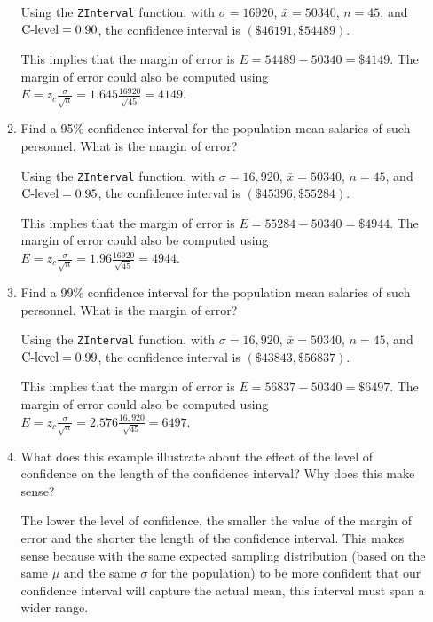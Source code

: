 \documentclass{article}
\newcommand{\answer}[1]{\color{red}#1}
\begin{document}
\begin{enumerate}
\begin{enumerate}
	{\answer Using the \texttt{ZInterval} function, with $\sigma = 16920$, $\bar{x} = 50340$, $n=45$, and $\textnormal{C-level} = 0.90$, the confidence interval is $(\$46191, \$54489)$. 
	
	This implies that the margin of error is $E = 54489 - 50340 = \$4149$. 
	The margin of error could also be computed using $\displaystyle E = z_c\frac{\sigma}{\sqrt{n}} = 1.645\frac{16920}{\sqrt{45}} = 4149$.
	} 

	\item Find a 95\% confidence interval for the population mean salaries of such personnel. What is the margin of error? 
	
	{\answer Using the \texttt{ZInterval} function, with $\sigma = 16,920$, $\bar{x} = 50340$, $n=45$, and $\textnormal{C-level} = 0.95$, the confidence interval is $(\$45396, \$55284)$. 
	
	This implies that the margin of error is $E = 55284 - 50340 = \$4944$. 
	The margin of error could also be computed using $\displaystyle E = z_c\frac{\sigma}{\sqrt{n}} = 1.96\frac{16920}{\sqrt{45}} =4944$.
	} 

	\item Find a 99\% confidence interval for the population mean salaries of such personnel. What is the margin of error? 
	
	{\answer Using the \texttt{ZInterval} function, with $\sigma = 16,920$, $\bar{x} = 50340$, $n=45$, and $\textnormal{C-level} = 0.99$, the confidence interval is $(\$43843, \$56837)$. 
	
	This implies that the margin of error is $E = 56837 - 50340 = \$6497$. 
	The margin of error could also be computed using $\displaystyle E = z_c\frac{\sigma}{\sqrt{n}} = 2.576\frac{16,920}{\sqrt{45}} = 6497$.
	} 

	\item What does this example illustrate about the effect of the level of confidence on the length of the confidence interval? Why does this make sense? 
	
	{\answer The lower the level of confidence, the smaller the value of the margin of error and the shorter the length of the confidence interval. This makes sense because with the same expected sampling distribution (based on the same $\mu$ and the same $\sigma$ for the population) to be more confident that our confidence interval will capture the actual mean, this interval must span a wider range.
	} 
	\end{enumerate}


\end{enumerate}

\vfill
\end{document}
